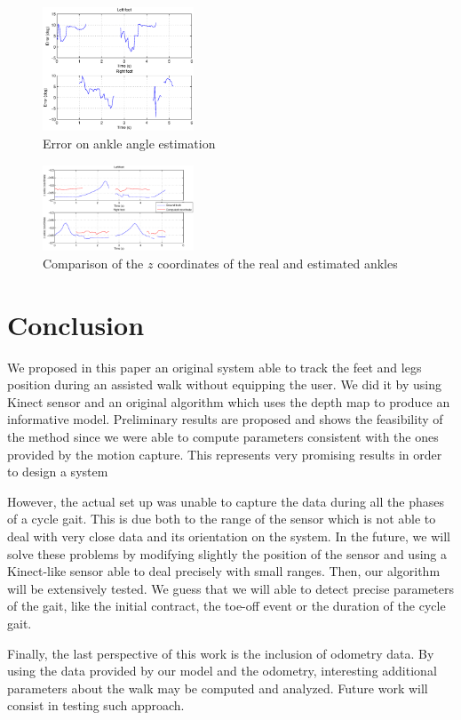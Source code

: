 \documentclass[letterpaper, 10 pt, conference]{ieeeconf}
\begin{document}
\begin{figure}
	\centering
	\includegraphics[width=0.4\textwidth,trim=.5cm 0.45cm 0cm 0cm,clip=true]{images/errorAnkle}
	\caption{Error on ankle angle estimation}
	\label{fig:errorAnkle}
\end{figure}

\begin{figure}
	\centering
	\includegraphics[width=0.4\textwidth,trim=.5cm 0.45cm 0cm 0cm,clip=true]{images/zAnkle}
	\caption{Comparison of the $z$ coordinates of the real and estimated ankles}
	\label{fig:zAnkle}
\end{figure}

\section{Conclusion}
We proposed in this paper an original system able to track the feet and legs position during an assisted walk without equipping the user. We did it by using Kinect sensor and an original algorithm which uses the depth map to produce an informative model. Preliminary results are proposed and shows the feasibility of the method since we were able to compute parameters consistent with the ones provided by the motion capture. This represents very promising results in order to design a system 

However, the actual set up was unable to capture the data during all the phases of a cycle gait. This is due both to the range of the sensor which is not able to deal with very close data and its orientation on the system. In the future, we will solve these problems by modifying slightly the position of the sensor and using a Kinect-like sensor able to deal precisely with small ranges. Then, our algorithm will be extensively tested. We guess that we will able to detect precise parameters of the gait, like the initial contract, the toe-off event or the duration of the cycle gait.

Finally, the last perspective of this work is the inclusion of odometry data. By using the data provided by our model and the odometry, interesting additional parameters about the walk may be computed and analyzed. Future work will consist in testing such approach.

 


\end{document}
